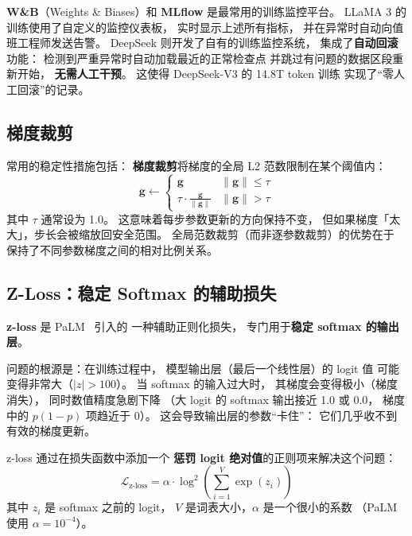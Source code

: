 \textbf{W\&B}（Weights \& Biases）和 \textbf{MLflow}
是最常用的训练监控平台。
LLaMA 3 的训练使用了自定义的监控仪表板，
实时显示上述所有指标，
并在异常时自动向值班工程师发送告警。
DeepSeek 则开发了自有的训练监控系统，
集成了\textbf{自动回滚}功能：
检测到严重异常时自动加载最近的正常检查点
并跳过有问题的数据区段重新开始，
\textbf{无需人工干预}。
这使得 DeepSeek-V3 的 14.8T token 训练
实现了“零人工回滚”的记录。

\subsection{梯度裁剪}

常用的稳定性措施包括：
\textbf{梯度裁剪}将梯度的全局 L2 范数限制在某个阈值内：
\begin{equation}
  \mathbf{g} \leftarrow \begin{cases}
    \mathbf{g} & \|\mathbf{g}\| \leq \tau \\
    \tau \cdot \frac{\mathbf{g}}{\|\mathbf{g}\|} & \|\mathbf{g}\| > \tau
  \end{cases}
  \label{eq:grad-clip}
\end{equation}
其中 $\tau$ 通常设为 1.0。
这意味着每步参数更新的方向保持不变，
但如果梯度「太大」，步长会被缩放回安全范围。
全局范数裁剪（而非逐参数裁剪）的优势在于
保持了不同参数梯度之间的相对比例关系。

\subsection{Z-Loss：稳定 Softmax 的辅助损失}

\textbf{z-loss} 是 PaLM~\cite{chowdhery2022palm} 引入的
一种辅助正则化损失，
专门用于\textbf{稳定 softmax 的输出层}。

问题的根源是：在训练过程中，
模型输出层（最后一个线性层）的 logit 值
可能变得非常大（$|z| > 100$）。
当 softmax 的输入过大时，
其梯度会变得极小（梯度消失），
同时数值精度急剧下降
（大 logit 的 softmax 输出接近 1.0 或 0.0，
梯度中的 $p(1-p)$ 项趋近于 0）。
这会导致输出层的参数“卡住”：
它们几乎收不到有效的梯度更新。

z-loss 通过在损失函数中添加一个
\textbf{惩罚 logit 绝对值}的正则项来解决这个问题：
\begin{equation}
  \mathcal{L}_{\text{z-loss}} = \alpha \cdot \log^2\!\left(
    \sum_{i=1}^{V} \exp(z_i)
  \right)
  \label{eq:z-loss}
\end{equation}
其中 $z_i$ 是 softmax 之前的 logit，
$V$ 是词表大小，$\alpha$ 是一个很小的系数
（PaLM 使用 $\alpha = 10^{-4}$）。

